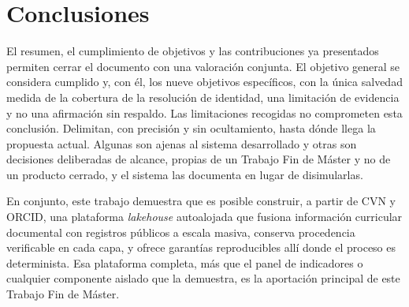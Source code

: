 \section{Conclusiones}
\label{sec:conclusiones_finales}

El resumen, el cumplimiento de objetivos y las contribuciones ya
presentados permiten cerrar el documento con una valoración conjunta. El
objetivo general se considera cumplido y, con él, los nueve objetivos
específicos, con la única salvedad medida de la cobertura de la
resolución de identidad, una limitación de evidencia y no una afirmación
sin respaldo. Las limitaciones recogidas no comprometen esta conclusión.
Delimitan, con precisión y sin ocultamiento, hasta dónde llega la
propuesta actual. Algunas son ajenas al sistema desarrollado y otras son
decisiones deliberadas de alcance, propias de un Trabajo Fin de Máster y
no de un producto cerrado, y el sistema las documenta en lugar de
disimularlas.

En conjunto, este trabajo demuestra que es posible construir, a partir de
CVN y ORCID, una plataforma \textit{lakehouse} autoalojada que fusiona
información curricular documental con registros públicos a escala masiva,
conserva procedencia verificable en cada capa, y ofrece garantías
reproducibles allí donde el proceso es determinista. Esa plataforma
completa, más que el panel de indicadores o cualquier componente aislado
que la demuestra, es la aportación principal de este Trabajo Fin de
Máster.
